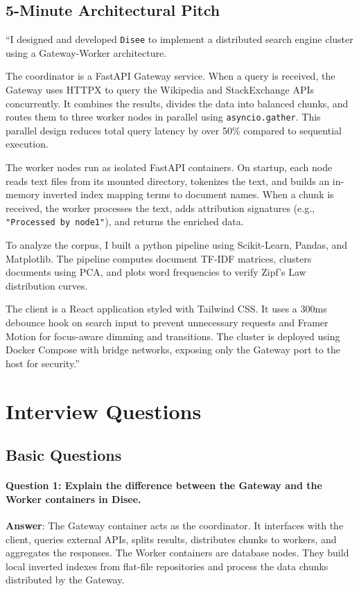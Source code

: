 \documentclass[11pt,a4paper]{article}
\begin{document}
\begin{itemize}
\subsection{5-Minute Architectural Pitch}
``I designed and developed \texttt{Disee} to implement a distributed search engine cluster using a Gateway-Worker architecture.

The coordinator is a FastAPI Gateway service. When a query is received, the Gateway uses HTTPX to query the Wikipedia and StackExchange APIs concurrently. It combines the results, divides the data into balanced chunks, and routes them to three worker nodes in parallel using \texttt{asyncio.gather}. This parallel design reduces total query latency by over 50\% compared to sequential execution.

The worker nodes run as isolated FastAPI containers. On startup, each node reads text files from its mounted directory, tokenizes the text, and builds an in-memory inverted index mapping terms to document names. When a chunk is received, the worker processes the text, adds attribution signatures (e.g., \texttt{"Processed by node1"}), and returns the enriched data.

To analyze the corpus, I built a python pipeline using Scikit-Learn, Pandas, and Matplotlib. The pipeline computes document TF-IDF matrices, clusters documents using PCA, and plots word frequencies to verify Zipf's Law distribution curves.

The client is a React application styled with Tailwind CSS. It uses a 300ms debounce hook on search input to prevent unnecessary requests and Framer Motion for focus-aware dimming and transitions. The cluster is deployed using Docker Compose with bridge networks, exposing only the Gateway port to the host for security.''

\newpage

\section{Interview Questions}

\subsection{Basic Questions}

\paragraph{Question 1: Explain the difference between the Gateway and the Worker containers in Disee.}
\textbf{Answer}: The Gateway container acts as the coordinator. It interfaces with the client, queries external APIs, splits results, distributes chunks to workers, and aggregates the responses. The Worker containers are database nodes. They build local inverted indexes from flat-file repositories and process the data chunks distributed by the Gateway.


\end{itemize}
\end{document}
